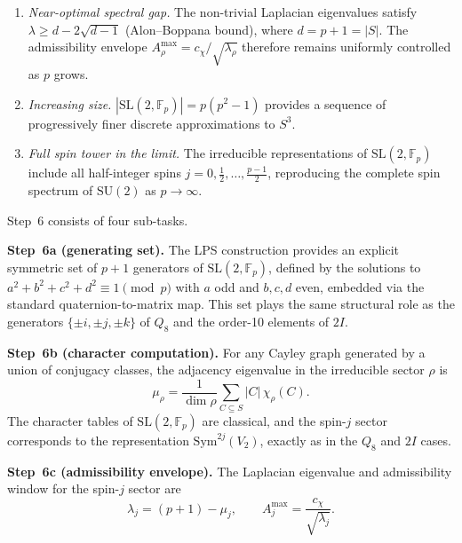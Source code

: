 \documentclass[11pt,a4paper]{article}
\begin{document}
      \begin{enumerate}
        \item \emph{Near-optimal spectral gap.}
        The non-trivial Laplacian eigenvalues satisfy
        $\lambda \ge d - 2\sqrt{d-1}$ (Alon--Boppana bound),
        where $d = p + 1 = |S|$.
        The admissibility envelope
        $A^{\max}_\rho = c_\chi/\sqrt{\lambda_\rho}$ therefore remains
        uniformly controlled as $p$ grows.

        \item \emph{Increasing size.}
        $|\mathrm{SL}(2,\mathbb{F}_p)| = p(p^2-1)$ provides a sequence of
        progressively finer discrete approximations to $S^3$.

        \item \emph{Full spin tower in the limit.}
        The irreducible representations of $\mathrm{SL}(2,\mathbb{F}_p)$
        include all half-integer spins
        $j = 0, \tfrac12, \ldots, \tfrac{p-1}{2}$,
        reproducing the complete spin spectrum of $\mathrm{SU}(2)$ as
        $p \to \infty$.
      \end{enumerate}

      Step~6 consists of four sub-tasks.

      \medskip
      \noindent\textbf{Step~6a (generating set).}
      The LPS construction provides an explicit symmetric set of $p+1$
      generators of $\mathrm{SL}(2,\mathbb{F}_p)$, defined by the solutions to
      $a^2+b^2+c^2+d^2 \equiv 1 \pmod p$ with $a$ odd and $b,c,d$ even,
      embedded via the standard quaternion-to-matrix map.
      This set plays the same structural role as the generators
      $\{\pm i,\pm j,\pm k\}$ of $Q_8$ and the order-10 elements of $2I$.

      \medskip
      \noindent\textbf{Step~6b (character computation).}
      For any Cayley graph generated by a union of conjugacy classes,
      the adjacency eigenvalue in the irreducible sector $\rho$ is
      \begin{equation}
        \mu_\rho
        =
        \frac{1}{\dim\rho}
        \sum_{C \subseteq S} |C|\,\chi_\rho(C).
        \label{eq:mu-SL2}
      \end{equation}
      The character tables of $\mathrm{SL}(2,\mathbb{F}_p)$ are classical,
      and the spin-$j$ sector corresponds to the representation
      $\mathrm{Sym}^{2j}(V_2)$, exactly as in the $Q_8$ and $2I$ cases.

      \medskip
      \noindent\textbf{Step~6c (admissibility envelope).}
      The Laplacian eigenvalue and admissibility window for the spin-$j$
      sector are
      \begin{equation}
        \lambda_j = (p+1) - \mu_j,
        \qquad
        A^{\max}_j = \frac{c_\chi}{\sqrt{\lambda_j}}.
        \label{eq:Amax-SL2}
      \end{equation}
\end{document}
